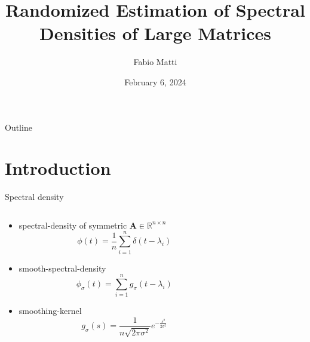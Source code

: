 \documentclass[aspectratio=169, 12pt]{beamer}
\title{Randomized Estimation of Spectral Densities of Large Matrices}
\date{February 6, 2024}
\author{Fabio Matti}
\newcommand{\mtx}[1]{\boldsymbol{#1}}
\begin{document}
\begin{frame}[noframenumbering]

    \titlepage

\end{frame}

\begin{frame}{Outline}

    \tableofcontents

    \begin{centering}
        
    \end{centering}
\end{frame}

\section{Introduction}

\begin{frame}{Spectral density}
    \begin{columns}
        \begin{column}{0.7\textwidth}
            \begin{itemize}
                \item \Gls{spectral-density} of symmetric $\mtx{A} \in \mathbb{R}^{n \times n}$
                \begin{equation}
                    \phi(t) = \frac{1}{n} \sum_{i=1}^n \delta(t - \lambda_i)
                \end{equation}
                \item \Gls{smooth-spectral-density}
                \begin{equation}
                    \phi_{\sigma}(t) = \sum_{i=1}^n g_{\sigma}(t - \lambda_i)
                \end{equation}
                \item \Gls{smoothing-kernel}
                \begin{equation}
                    g_{\sigma}(s) = \frac{1}{n \sqrt{2 \pi \sigma^2}} e^{-\frac{s^2}{2\sigma^2}}
                \end{equation}
            \end{itemize}
        \end{column}
        \begin{column}{0.3\textwidth}
            \centering
        \end{column}
    \end{columns}
\end{frame}
\end{document}
